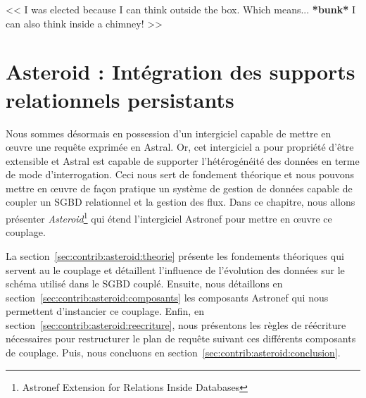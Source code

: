 \begin{savequote}[6cm]
<< I was elected because I can think outside the box. 
Which means... \textbf{*bunk*} I can also think inside a chimney! >>
\end{savequote}

\chapter{Asteroid : Intégration des supports relationnels persistants}\label{chap:contrib:asteroid}
\chaptertoc

Nous sommes désormais en possession d'un intergiciel capable de mettre en œuvre une requête exprimée en Astral. Or, cet intergiciel a pour propriété d'être extensible et Astral est capable de supporter l'hétérogénéité des données en terme de mode d'interrogation. Ceci nous sert de fondement théorique et nous pouvons mettre en œuvre de façon pratique un système de gestion de données capable de coupler un SGBD relationnel et la gestion des flux. Dans ce chapitre, nous allons présenter \textit{Asteroid}\footnote{Astronef Extension for Relations Inside Databases} qui étend l'intergiciel Astronef pour mettre en œuvre ce couplage.

La section~\ref{sec:contrib:asteroid:theorie} présente les fondements théoriques qui servent au le couplage et détaillent l'influence de l'évolution des données sur le schéma utilisé dans le SGBD couplé. Ensuite, nous détaillons en section~\ref{sec:contrib:asteroid:composants} les composants Astronef qui nous permettent d'instancier ce couplage. Enfin, en section~\ref{sec:contrib:asteroid:reecriture}, nous présentons les règles de réécriture nécessaires pour restructurer le plan de requête suivant ces différents composants de couplage. Puis, nous concluons en section~\ref{sec:contrib:asteroid:conclusion}.





